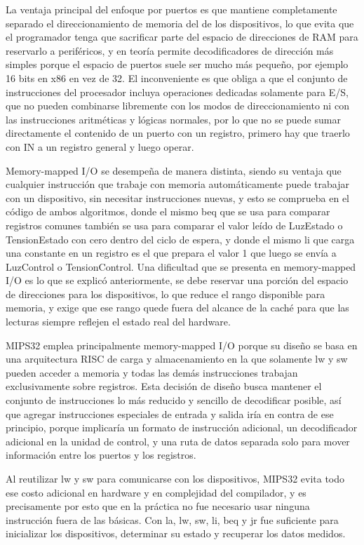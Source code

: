 \documentclass[12pt, letterpaper]{article}
\begin{document}
La ventaja principal del enfoque por puertos es que mantiene completamente separado el direccionamiento de memoria del de los dispositivos, lo que evita que el programador tenga que sacrificar parte del espacio de direcciones de RAM para reservarlo a periféricos, y en teoría permite decodificadores de dirección más simples porque el espacio de puertos suele ser mucho más pequeño, por ejemplo 16 bits en x86 en vez de 32. El inconveniente es que obliga a que el conjunto de instrucciones del procesador incluya operaciones dedicadas solamente para E/S, que no pueden combinarse libremente con los modos de direccionamiento ni con las instrucciones aritméticas y lógicas normales, por lo que no se puede sumar directamente el contenido de un puerto con un registro, primero hay que traerlo con IN a un registro general y luego operar.

Memory-mapped I/O se desempeña de manera distinta, siendo su ventaja que cualquier instrucción que trabaje con memoria automáticamente puede trabajar con un dispositivo, sin necesitar instrucciones nuevas, y esto se comprueba en el código de ambos algoritmos, donde el mismo beq que se usa para comparar registros comunes también se usa para comparar el valor leído de LuzEstado o TensionEstado con cero dentro del ciclo de espera, y donde el mismo li que carga una constante en un registro es el que prepara el valor 1 que luego se envía a LuzControl o TensionControl. Una dificultad que se presenta en memory-mapped I/O es lo que se explicó anteriormente, se debe reservar una porción del espacio de direcciones para los dispositivos, lo que reduce el rango disponible para memoria, y exige que ese rango quede fuera del alcance de la caché para que las lecturas siempre reflejen el estado real del hardware.

MIPS32 emplea principalmente memory-mapped I/O porque su diseño se basa en una arquitectura RISC de carga y almacenamiento en la que solamente lw y sw pueden acceder a memoria y todas las demás instrucciones trabajan exclusivamente sobre registros. Esta decisión de diseño busca mantener el conjunto de instrucciones lo más reducido y sencillo de decodificar posible, así que agregar instrucciones especiales de entrada y salida iría en contra de ese principio, porque implicaría un formato de instrucción adicional, un decodificador adicional en la unidad de control, y una ruta de datos separada solo para mover información entre los puertos y los registros.

Al reutilizar lw y sw para comunicarse con los dispositivos, MIPS32 evita todo ese costo adicional en hardware y en complejidad del compilador, y es precisamente por esto que en la práctica no fue necesario usar ninguna instrucción fuera de las básicas. Con la, lw, sw, li, beq y jr fue suficiente para inicializar los dispositivos, determinar su estado y recuperar los datos medidos.\newpage
\end{document}

